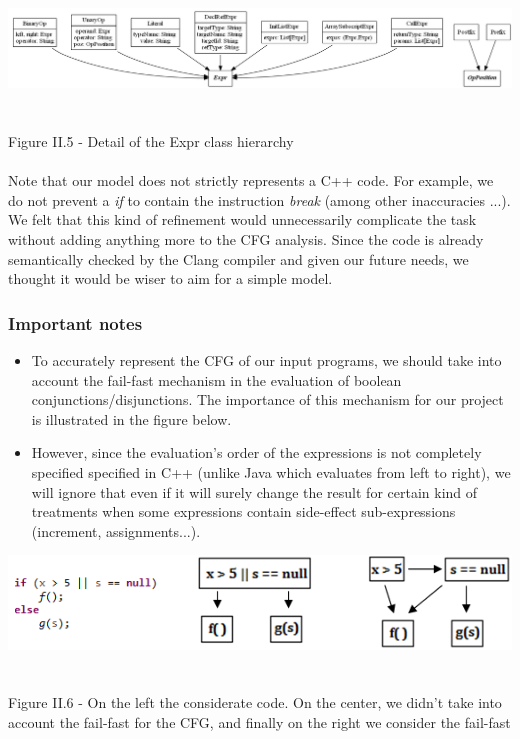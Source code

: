 \documentclass{report}
\begin{document}
\begin{center}
\includegraphics[scale=0.35]{data/Expr_classes.png}
~\\~\\Figure II.5 - Detail of the Expr class hierarchy
\end{center}

\paragraph{}
\hspace{4mm}\textnormal{Note that our model does not strictly represents a C++ code. For example, we do not prevent a \textit{if} to contain the instruction \textit{break}
(among other inaccuracies ...). We felt that this kind of refinement would unnecessarily complicate the task without adding anything more to the CFG analysis. 
Since the code is already semantically checked by the Clang compiler and given our future needs, we thought it would be wiser to aim for a simple model.}

\subsubsection{Important notes}

\vspace{1.5mm}
\begin{itemize}
\item To accurately represent the CFG of our input programs, we should take into account the fail-fast mechanism in the evaluation of boolean conjunctions/disjunctions.
The importance of this mechanism for our project is illustrated in the figure below.\vspace{1mm}
\item However, since the evaluation's order of the expressions is not completely specified specified in C++ (unlike Java which evaluates from left to right),
we will ignore that even if it will surely change the result for certain kind of treatments when some expressions contain side-effect sub-expressions
 (increment, assignments...).\vspace{1mm}
\end{itemize}

\begin{center}
\includegraphics[scale=0.85]{data/fail-fast.png}
~\\~\\Figure II.6 - On the left the considerate code. On the center, we didn't take into account the fail-fast for the CFG, and finally on the right we consider the fail-fast
\end{center}
\end{document}
